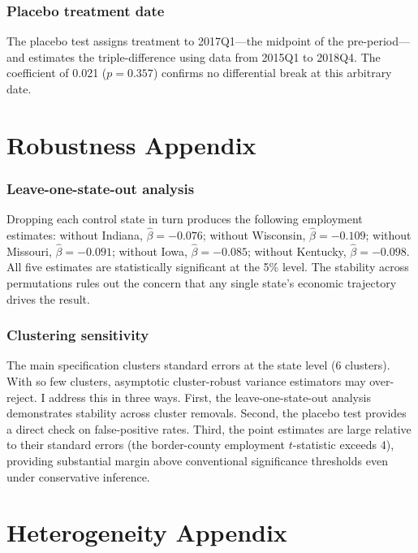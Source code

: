 \documentclass[12pt]{article}
\begin{document}
\subsubsection*{Placebo treatment date} The placebo test assigns treatment to 2017Q1---the midpoint of the pre-period---and estimates the triple-difference using data from 2015Q1 to 2018Q4. The coefficient of 0.021 ($p = 0.357$) confirms no differential break at this arbitrary date.


\section{Robustness Appendix}
\label{app:robustness}

\subsubsection*{Leave-one-state-out analysis} Dropping each control state in turn produces the following employment estimates: without Indiana, $\hat{\beta} = -0.076$; without Wisconsin, $\hat{\beta} = -0.109$; without Missouri, $\hat{\beta} = -0.091$; without Iowa, $\hat{\beta} = -0.085$; without Kentucky, $\hat{\beta} = -0.098$. All five estimates are statistically significant at the 5\% level. The stability across permutations rules out the concern that any single state's economic trajectory drives the result.

\subsubsection*{Clustering sensitivity} The main specification clusters standard errors at the state level (6 clusters). With so few clusters, asymptotic cluster-robust variance estimators may over-reject. I address this in three ways. First, the leave-one-state-out analysis demonstrates stability across cluster removals. Second, the placebo test provides a direct check on false-positive rates. Third, the point estimates are large relative to their standard errors (the border-county employment $t$-statistic exceeds 4), providing substantial margin above conventional significance thresholds even under conservative inference.


\section{Heterogeneity Appendix}
\label{app:heterogeneity}
\end{document}
